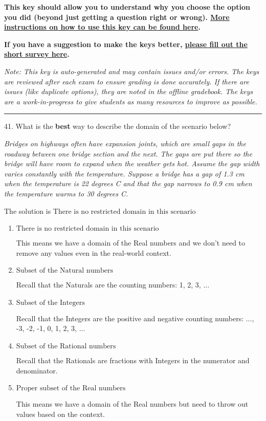 \documentclass{article}[14pt]
\begin{document}
\textbf{This key should allow you to understand why you choose the option you did (beyond just getting a question right or wrong). \href{https://xronos.clas.ufl.edu/mac1105spring2020/courseDescriptionAndMisc/Exams/LearningFromResults}{More instructions on how to use this key can be found here}.}

\textbf{If you have a suggestion to make the keys better, \href{https://forms.gle/CZkbZmPbC9XALEE88}{please fill out the short survey here}.}

\textit{Note: This key is auto-generated and may contain issues and/or errors. The keys are reviewed after each exam to ensure grading is done accurately. If there are issues (like duplicate options), they are noted in the offline gradebook. The keys are a work-in-progress to give students as many resources to improve as possible.}

\rule{\textwidth}{0.4pt}

41. What is the \textbf{best} way to describe the domain of the scenario below?
\begin{center} \textit{Bridges on highways often have expansion joints, which are small gaps in the roadway between one bridge section and the next. The gaps are put there so the bridge will have room to expand when the weather gets hot. Assume the gap width varies constantly with the temperature. Suppose a bridge has a gap of 1.3 cm when the temperature is 22 degrees C and that the gap narrows to 0.9 cm when the temperature warms to 30 degrees C.} \end{center} 
The solution is $ \text{There is no restricted domain in this scenario} $ 

\begin{enumerate}[label=\Alph*.] 
\item $ \text{There is no restricted domain in this scenario} $ 

 This means we have a domain of the Real numbers and we don't need to remove any values even in the real-world context. 
\item $ \text{Subset of the Natural numbers} $ 

 Recall that the Naturals are the counting numbers: 1, 2, 3, ... 
\item $ \text{Subset of the Integers} $ 

 Recall that the Integers are the positive and negative counting numbers: ..., -3, -2, -1, 0, 1, 2, 3, ...  
\item $ \text{Subset of the Rational numbers} $ 

 Recall that the Rationals are fractions with Integers in the numerator and denominator. 
\item $ \text{Proper subset of the Real numbers} $ 

 This means we have a domain of the Real numbers but need to throw out values based on the context. 
\end{enumerate} 
 
\end{document}

